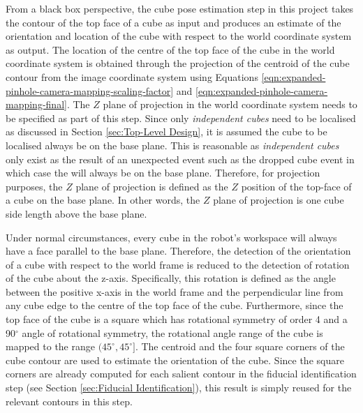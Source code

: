 From a black box perspective, the cube pose estimation step in this project takes the contour of the top face of a cube as input and produces an estimate of the orientation and location of the cube with respect to the world coordinate system as output. The location of the centre of the top face of the cube in the world coordinate system is obtained through the projection of the centroid of the cube contour from the image coordinate system using Equations \ref{eqn:expanded-pinhole-camera-mapping-scaling-factor} and \ref{eqn:expanded-pinhole-camera-mapping-final}. The $Z$ plane of projection in the world coordinate system needs to be specified as part of this step. Since only \textit{independent cubes} need to be localised as discussed in Section \ref{sec:Top-Level Design}, it is assumed the cube to be localised always be on the base plane. This is reasonable as \textit{independent cubes} only exist as the result of an unexpected event such as the dropped cube event in which case the  will always be on the base plane. Therefore, for projection purposes, the $Z$ plane of projection is defined as the $Z$ position of the top-face of a cube on the base plane. In other words, the $Z$ plane of projection is one cube side length above the base plane.

Under normal circumstances, every cube in the robot's workspace will always have a face parallel to the base plane. Therefore, the detection of the orientation of a cube with respect to the world frame is reduced to the detection of rotation of the cube about the z-axis. Specifically, this rotation is defined as the angle between the positive x-axis in the world frame and the perpendicular line from any cube edge to the centre of the top face of the cube. Furthermore, since the top face of the cube is a square which has rotational symmetry of order 4 and a 90$^{\circ}$ angle of rotational symmetry, the rotational angle range of the cube is mapped to the range $(45^{\circ},45^{\circ}]$. The centroid and the four square corners of the cube contour are used to estimate the orientation of the cube. Since the square corners are already computed for each salient contour in the fiducial identification step (see Section \ref{sec:Fiducial Identification}), this result is simply reused for the relevant contours in this step.

